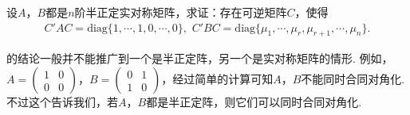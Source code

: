 \documentclass[../../main.tex]{subfiles}
\begin{document}
\begin{proposition}[两个半正定阵可同时合同对角化]\label{proposition:两个半正定阵可同时合同对角化2}
设\(A\)，\(B\)都是\(n\)阶半正定实对称矩阵，求证：存在可逆矩阵\(C\)，使得
\begin{align*}
C'AC = \mathrm{diag}\{1,\cdots,1,0,\cdots,0\},\,\,C'BC = \mathrm{diag}\{\mu_1,\cdots,\mu_r,\mu_{r + 1},\cdots,\mu_n\}.
\end{align*}
\end{proposition}
\begin{remark}
的结论一般并不能推广到一个是半正定阵，另一个是实对称矩阵的情形. 例如，\(A=\begin{pmatrix}1&0\\0&0\end{pmatrix}\)，\(B=\begin{pmatrix}0&1\\1&0\end{pmatrix}\)，经过简单的计算可知\(A\)，\(B\)不能同时合同对角化. 不过这个告诉我们，若\(A\)，\(B\)都是半正定阵，则它们可以同时合同对角化.
\end{remark}
\end{document}
